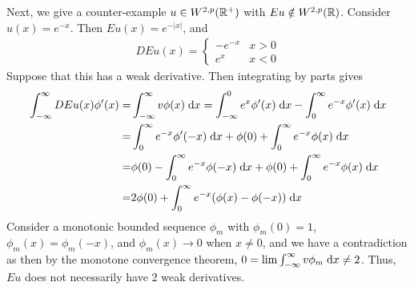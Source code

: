 Next, we give a counter-example $u \in W^{2, p}(\mathbb{R}^+)$ with $E u \notin W^{2, p}(\mathbb{R})$.
Consider $u(x) = e^{-x}$.
Then $E u(x) = e^{-|x|}$, and
\begin{align*}
D E u(x) = 
\begin{cases}
  -e^{-x} & x > 0\\
  e^{x} & x < 0
\end{cases}
\end{align*}
Suppose that this has a weak derivative.
Then integrating by parts gives
\begin{align*}
\int_{-\infty}^{\infty} D E u(x) \phi'(x) = &\int_{-\infty}^{\infty} v \phi(x) \;\mathrm{d}x
                                       = \int_{-\infty}^{0} e^{x} \phi'(x) \;\mathrm{d}x
                                         - \int_{0}^{\infty} e^{-x} \phi'(x) \;\mathrm{d}x\\
                                       = &\int_{0}^{\infty} e^{-x} \phi'(-x) \;\mathrm{d}x
                                         + \phi(0) + \int_{0}^{\infty} e^{-x} \phi(x) \;\mathrm{d}x\\
                                       = &\phi(0) - \int_{0}^{\infty} e^{-x} \phi(-x) \;\mathrm{d}x
                                         + \phi(0) + \int_{0}^{\infty} e^{-x} \phi(x) \;\mathrm{d}x\\
                                       = &2 \phi(0) + \int_{0}^{\infty} e^{-x} (\phi(x) - \phi(-x)) \;\mathrm{d}x
\end{align*}
Consider a monotonic bounded sequence $\phi_m$ with $\phi_m(0) = 1$, $\phi_m(x) = \phi_m(-x)$,
and $\phi_m(x) \rightarrow 0$ when $x \neq 0$,
and we have a contradiction as then by the monotone convergence theorem, $0 = \lim \int_{-\infty}^{\infty} v \phi_m \;\mathrm{d}x \neq 2$.
Thus, $E u$ does not necessarily have 2 weak derivatives.
